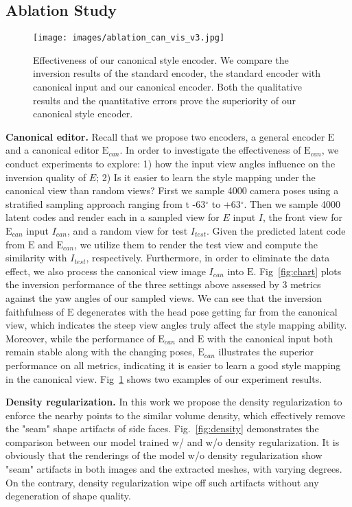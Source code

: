 \documentclass[acmtog]{acmart}
\begin{document}
\subsection{Ablation Study}
\label{sec:4.2}

\begin{figure}[t]
  \centering
  \texttt{[image: images/ablation\_can\_vis\_v3.jpg]}
  \caption{Effectiveness of our canonical style encoder. We compare the inversion results of the standard encoder, the standard encoder with canonical input and our canonical encoder. Both the qualitative results and the quantitative errors prove the superiority of our canonical style encoder.}
  \Description{}
  \label{fig:ablation_can}
\end{figure}

\noindent \textbf{Canonical editor.} Recall that we propose two encoders, a general encoder $\mathrm{E}$ and a canonical editor $\mathrm{E}_{can}$. In order to investigate the effectiveness of $\mathrm{E}_{can}$, we conduct experiments to explore: 1) how the input view angles influence on the inversion quality of $E$; 2) Is it easier to learn the style mapping under the canonical view than random views? First we sample 4000 camera poses using a stratified
sampling approach ranging from t -63$^{\circ}$ to +63$^{\circ}$. Then we sample 4000 latent codes and render each in a sampled view for $E$ input $I$, the front view for $\mathrm{E}_{can}$ input $I_{can}$, and a random view for test $I_{test}$. Given the predicted latent code from $\mathrm{E}$ and $\mathrm{E}_{can}$, we utilize them to render the test view and compute the similarity with $I_{test}$, respectively. Furthermore, in order to eliminate the data effect, we also process the canonical view image $I_{can}$ into $\mathrm{E}$. Fig~\ref{fig:chart} plots the inversion performance of the three settings above assessed by 3 metrics against the yaw angles of our sampled views. We can see that the inversion faithfulness of $\mathrm{E}$ degenerates with the head pose getting far from the canonical view, which indicates the steep view angles truly affect the style mapping ability. Moreover, while the performance of $\mathrm{E}_{can}$ and $\mathrm{E}$ with the canonical input both remain stable along with the changing poses, $\mathrm{E}_{can}$ illustrates the superior performance on all metrics, indicating it is easier to learn a good style mapping in the canonical view. Fig~\ref{fig:ablation_can} shows two examples of our experiment results. 

\noindent \textbf{Density regularization.} In this work we propose the density regularization to enforce the nearby points to the similar volume density, which effectively remove the "seam" shape artifacts of side faces. Fig.~\ref{fig:density} demonstrates the comparison between our model trained w/ and w/o density regularization. It is obviously that the renderings of the model w/o density regularization show "seam" artifacts in both images and the extracted meshes, with varying degrees. On the contrary, density regularization wipe off such artifacts without any degeneration of shape quality. 
\end{document}

